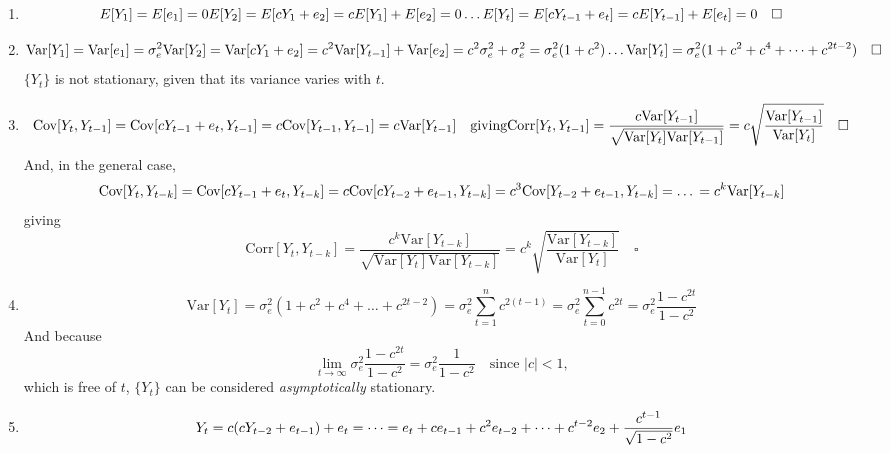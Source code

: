 \documentclass[]{book}
\begin{document}
\begin{enumerate}
\def\labelenumi{(\alph{enumi})}
\item
  \[
    E[Y_1] = E[e_1] = 0\\
    E[Y_2] = E[cY_{1}+e_2] = cE[Y_1] + E[e_2] = 0\\
    \dots\\
    E[Y_t] = E[cY_{t-1}+e_t] = cE[Y_{t-1}] + E[e_t] = 0\quad \square
  \]
\item
  \[
    \text{Var}[Y_1] = \text{Var}[e_1] = \sigma_e^2\\
    \text{Var}[Y_2] = \text{Var}[cY_{1} + e_2] = c^2\text{Var}[Y_{t-1}] + \text{Var}[e_2] = c^2\sigma_e^2 + \sigma_e^2 = \sigma_e^2(1 + c^2)\\
    \dots\\
    \text{Var}[Y_t] = \sigma_e^2(1 + c^2 + c^4 + \dots + c^{2t-2}) \quad\square
  \] \(\{Y_t\}\) is not stationary, given that its variance varies with
  \(t\).
\item
  \[
    \text{Cov}[Y_t, Y_{t-1}] = \text{Cov}[cY_{t-1} + e_t, Y_{t-1}] = c\text{Cov}[Y_{t-1}, Y_{t-1}] = c\text{Var}[Y_{t-1}]\quad \text{giving}\\
    \text{Corr}[Y_t, Y_{t-1}] = \frac{c\text{Var}[Y_{t-1}]}{\sqrt{\text{Var}[Y_t]\text{Var}[Y_{t-1}]}} =
      c \sqrt{\frac{\text{Var}[Y_{t-1}]}{\text{Var}[Y_t]}}\quad\square
  \] And, in the general case, \[
    \text{Cov}[Y_t, Y_{t-k}] = \text{Cov}[cY_{t-1}+e_t, Y_{t-k}] = \\
    c\text{Cov}[cY_{t-2} + e_{t-1}, Y_{t-k}] =\\
    c^3\text{Cov}[Y_{t-2} + e_{t-1}, Y_{t-k}] = \dots\\ = c^k\text{Var}[Y_{t-k}]
  \] giving \[
    \text{Corr}[Y_t, Y_{t-k}] = \frac{c^k\text{Var}[Y_{t-k}]}{\sqrt{\text{Var}[Y_t]\text{Var}[Y_{t-k}]}} =
      c^k \sqrt{\frac{\text{Var}[Y_{t-k}]}{\text{Var}[Y_t]}}\quad\square
  \]
\item
  \[
    \text{Var}[Y_t] = \sigma_e^2(1+c^2+c^4+\dots+c^{2t-2}) = \sigma_e^2\sum_{t=1}^{n}c^{2(t-1)}=\sigma_e^2 \sum_{t=0}^{n-1} c^{2t} =
      \sigma_e^2 \frac{1-c^{2t}}{1-c^2}
  \] And because \[
  \lim_{t \rightarrow \infty} \sigma_e^2 \frac{1-c^{2t}}{1-c^2} = \sigma_e^2 \frac{1}{1-c^2}\quad\text{since }|c| < 1,
  \] which is free of \(t\), \(\{Y_t\}\) can be considered
  \emph{asymptotically} stationary.
\item
  \[
    Y_t = c(cY_{t-2} + e_{t-1}) + e_t = \dots = e_t+ce_{t-1} + c^2e_{t-2} + \dots + c^{t-2}e_2+ \frac{c^{t-1}}{\sqrt{1-c^2}}e_1\\
\]
\end{enumerate}
\end{document}
